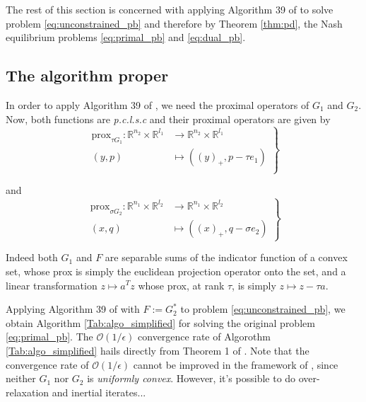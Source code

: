 \documentclass{article} %
\begin{document}
The rest of this section is concerned with applying Algorithm 39 of \cite{chambolle2010} to solve problem
\eqref{eq:unconstrained_pb} and therefore by Theorem \ref{thm:pd}, the Nash equilibrium problems \eqref{eq:primal_pb} and \eqref{eq:dual_pb}.

\subsection{The algorithm proper}
In order to apply Algorithm 39 of \cite{chambolle2010}, we need the proximal operators of
$G_1$ and $G_2$. Now, both functions are \textit{p.c.l.s.c} and their proximal operators are given by
  \begin{equation}
    \left .
    \begin{split}
      \text{prox}_{\tau G_1} : \mathbb{R}^{n_2} \times \mathbb{R}^{l_1} &\rightarrow \mathbb{R}^{n_2} \times \mathbb{R}^{l_1}\\
      (y, p) &\mapsto ((y)_+, p - \tau e_1)\\
    \end{split}
    \right\}
  \end{equation}

  and
  \begin{equation}
    \left .
    \begin{split}
      \text{prox}_{\sigma G_2}: \mathbb{R}^{n_1} \times \mathbb{R}^{l_2} &\rightarrow \mathbb{R}^{n_1} \times \mathbb{R}^{l_2}\\
      (x, q) &\mapsto ((x)_+, q - \sigma e_2)
    \end{split}
    \right\}
  \end{equation}

Indeed both $G_1$ and $F$ are separable sums of the indicator function of a convex set, whose prox is simply the euclidean projection operator onto the set,  and a linear transformation $z \mapsto a^Tz$ whose prox, at rank $\tau$, is simply $z \mapsto z - \tau a$.

Applying Algorithm 39 of \cite{chambolle2010} with $F := G_2^*$
 to problem \eqref{eq:unconstrained_pb}, we obtain Algorithm \ref{Tab:algo_simplified} for solving the original problem \eqref{eq:primal_pb}. The $\mathcal{O}(1/\epsilon)$ convergence rate of Algorothm \ref{Tab:algo_simplified} hails directly from Theorem 1 of \cite{chambolle2010}.
  Note that the convergence rate of $\mathcal{O}(1/\epsilon)$ cannot be improved in the framework of \cite{chambolle2010}, since neither $G_1$ nor $G_2$ is \textit{uniformly convex}.
However, it's possible to do over-relaxation and inertial iterates...
\end{document}
